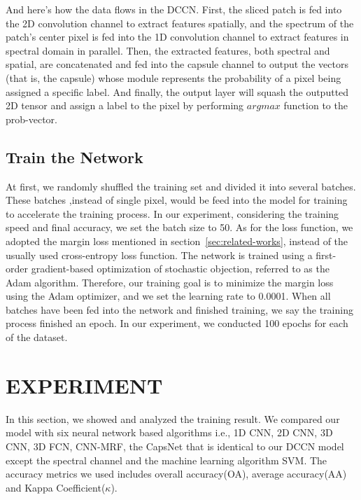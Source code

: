 \documentclass{article}
\begin{document}
	And here's how the data flows in the DCCN.
	First, the sliced patch is fed into the 2D convolution channel to extract features spatially, and the spectrum
	of the patch's center pixel is fed into the 1D convolution channel to extract features in spectral domain in
	parallel.
	Then, the extracted features, both spectral and spatial, are concatenated and fed into the capsule channel to output
	the vectors (that is, the capsule) whose module represents the probability of a pixel being assigned a specific
	label.
	And finally, the output layer will squash the outputted 2D tensor and assign a label to the pixel by performing
	$argmax$ function to the prob-vector.

	\subsection{Train the Network}\label{subsec:train-the-network}
	At first, we randomly shuffled the training set and divided it into several batches.
	These batches ,instead of single pixel, would be feed into the model for training to accelerate the training process.
	In our experiment, considering the training speed and final accuracy, we set the batch size to 50.
	As for the loss function, we adopted the margin loss mentioned in section~\ref{sec:related-works}, instead of the
	usually used cross-entropy loss function.
	The network is trained using a first-order gradient-based optimization of stochastic objection, referred to as the
	Adam algorithm.
	Therefore, our training goal is to minimize the margin loss using the Adam optimizer, and we set the learning rate
	to 0.0001.
	When all batches have been fed into the network and finished training, we say the training process finished an epoch.
	In our experiment, we conducted 100 epochs for each of the dataset.


	\section{EXPERIMENT}\label{sec:experiment}
	In this section, we showed and analyzed the training result.
	We compared our model with six neural network based algorithms i.e.,
	1D CNN\cite{hu2015deep},
	2D CNN\cite{sharma2016hyperspectral},
	3D CNN\cite{hamida20183},
	3D FCN\cite{lee2016contextual},
	CNN-MRF\cite{cao2018hyperspectral},
	the CapsNet that is identical to our DCCN model except the spectral channel and the machine learning algorithm SVM\@.
	The accuracy metrics we used includes overall accuracy(OA), average accuracy(AA) and Kappa Coefficient($\kappa$).
\end{document}
